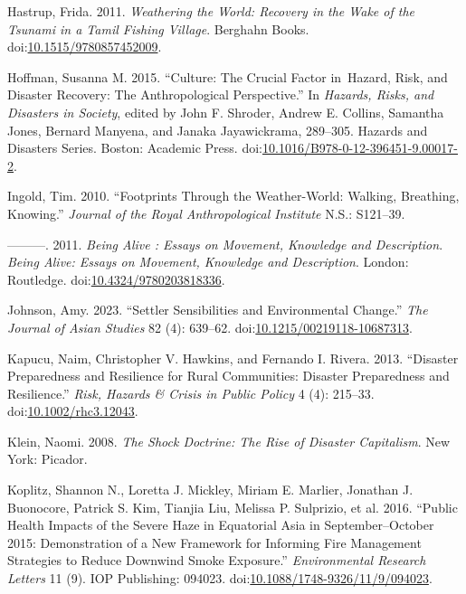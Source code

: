 \documentclass[
]{article}
\newlength{\cslhangindent}
\newenvironment{CSLReferences}[2] %
 {\begin{list}{}{%
  \setlength{\itemindent}{0pt}
  \setlength{\leftmargin}{0pt}
  \setlength{\parsep}{0pt}
  \ifodd #1
   \setlength{\leftmargin}{\cslhangindent}
   \setlength{\itemindent}{-1\cslhangindent}
  \fi
  \setlength{\itemsep}{#2\baselineskip}}}
 {\end{list}}
\begin{document}
\begin{CSLReferences}{1}{0}
Hastrup, Frida. 2011. \emph{Weathering the {World}: {Recovery} in the {Wake} of the {Tsunami} in a {Tamil Fishing Village}}. Berghahn Books. doi:\href{https://doi.org/10.1515/9780857452009}{10.1515/9780857452009}.

Hoffman, Susanna M. 2015. {``Culture: {The Crucial Factor} in~{Hazard}, {Risk}, and {Disaster Recovery}: {The Anthropological Perspective}.''} In \emph{Hazards, {Risks}, and {Disasters} in {Society}}, edited by John F. Shroder, Andrew E. Collins, Samantha Jones, Bernard Manyena, and Janaka Jayawickrama, 289--305. Hazards and {Disasters Series}. Boston: Academic Press. doi:\href{https://doi.org/10.1016/B978-0-12-396451-9.00017-2}{10.1016/B978-0-12-396451-9.00017-2}.

Ingold, Tim. 2010. {``Footprints Through the Weather-World: Walking, Breathing, Knowing.''} \emph{Journal of the Royal Anthropological Institute} N.S.: S121--39.

---------. 2011. \emph{Being {Alive} : {Essays} on {Movement}, {Knowledge} and {Description}}. \emph{Being Alive: Essays on Movement, Knowledge and Description}. London: Routledge. doi:\href{https://doi.org/10.4324/9780203818336}{10.4324/9780203818336}.

Johnson, Amy. 2023. {``Settler {Sensibilities} and {Environmental Change}.''} \emph{The Journal of Asian Studies} 82 (4): 639--62. doi:\href{https://doi.org/10.1215/00219118-10687313}{10.1215/00219118-10687313}.

Kapucu, Naim, Christopher V. Hawkins, and Fernando I. Rivera. 2013. {``Disaster {Preparedness} and {Resilience} for {Rural Communities}: {Disaster Preparedness} and {Resilience}.''} \emph{Risk, Hazards \& Crisis in Public Policy} 4 (4): 215--33. doi:\href{https://doi.org/10.1002/rhc3.12043}{10.1002/rhc3.12043}.

Klein, Naomi. 2008. \emph{The Shock Doctrine: The Rise of Disaster Capitalism}. New York: Picador.

Koplitz, Shannon N., Loretta J. Mickley, Miriam E. Marlier, Jonathan J. Buonocore, Patrick S. Kim, Tianjia Liu, Melissa P. Sulprizio, et al. 2016. {``Public Health Impacts of the Severe Haze in {Equatorial Asia} in {September}--{October} 2015: Demonstration of a New Framework for Informing Fire Management Strategies to Reduce Downwind Smoke Exposure.''} \emph{Environmental Research Letters} 11 (9). IOP Publishing: 094023. doi:\href{https://doi.org/10.1088/1748-9326/11/9/094023}{10.1088/1748-9326/11/9/094023}.


\end{CSLReferences}
\end{document}
